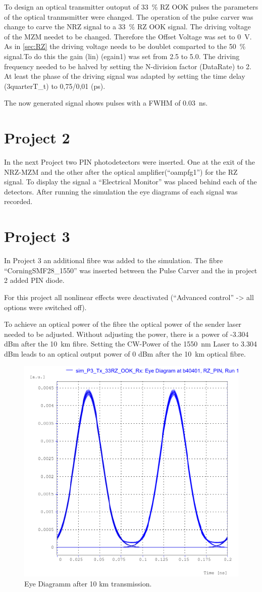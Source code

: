 To design an optical transmitter outoput of 33~\% RZ OOK pulses the parameters of the optical tranmsmitter were changed. 
The operation of the pulse carver was change to carve the NRZ signal to a 33~\% RZ OOK signal. The driving voltage of the MZM needet to be changed. Therefore the Offset Voltage was set to 0~V. As in \ref{sec:RZ} the driving voltage needs to be doublet comparted to the 50~\% signal.To do this the gain (lin) (egain1) was set from 2.5 to 5.0. The driving frequency needed to be halved by setting the N-division factor (DataRate) to 2.
At least the phase of the driving signal was adapted by setting the time delay (3quarterT\_t) to 0,75/0,01 (ps).

The now generated signal shows pulses with a FWHM of 0.03~ns.



\section{Project 2}
In the next Project two PIN photodetectors were inserted. One at the exit of the NRZ-MZM and the other after the optical amplifier("`oampfg1"') for the RZ signal. To display the signal a "`Electrical Monitor"' was placed behind each of the detectors. After running the simulation the eye diagrams of each signal was recorded.






\section{Project 3}
\label{sec:P3}
In Project 3 an additional fibre was added to the simulation. The fibre "`CorningSMF28\_1550"' was inserted between the Pulse Carver and the in project 2 added PIN diode. 

For this project all nonlinear effects were deactivated ("`Advanced control"' -> all options were switched off).

To achieve an optical power of the fibre the optical power of the sender laser needed to be adjusted. Without adjusting the power, there is a power of -3.304 dBm after the 10~km fibre. Setting the CW-Power of the 1550~nm Laser to 3.304 dBm leads to an optical output power of 0 dBm after the 10~km optical fibre.

\begin{figure}%
\centering
\includegraphics[width=.5\columnwidth]{Grafiken/P3ExB_Eye.pdf}%
\caption{Eye Diagramm after 10 km transmission.}%
\label{fig:P3ExB_Eyes}%
\end{figure}

